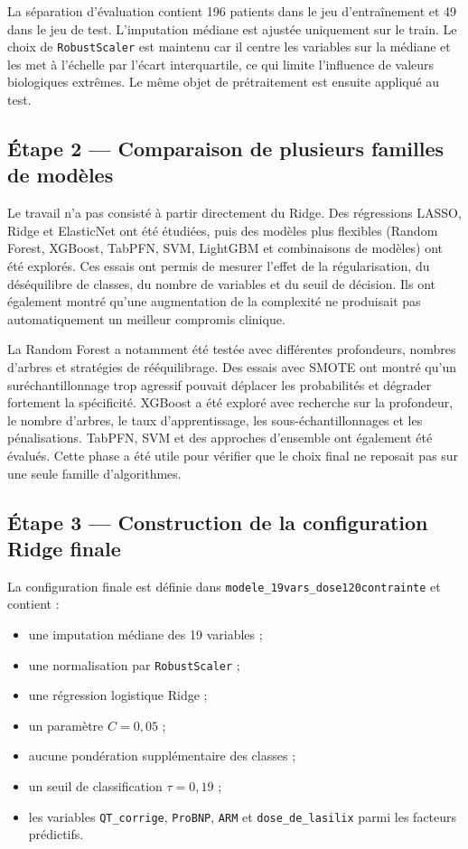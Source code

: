 \documentclass[12pt,a4paper]{report}
\begin{document}
La séparation d'évaluation contient 196 patients dans le jeu d'entraînement et 49 dans le
jeu de test. L'imputation médiane est ajustée uniquement sur le train. Le choix de
\texttt{RobustScaler} est maintenu car il centre les variables sur la médiane et les met à
l'échelle par l'écart interquartile, ce qui limite l'influence de valeurs biologiques
extrêmes. Le même objet de prétraitement est ensuite appliqué au test.

\subsection{Étape 2 --- Comparaison de plusieurs familles de modèles}

Le travail n'a pas consisté à partir directement du Ridge. Des régressions LASSO, Ridge et
ElasticNet ont été étudiées, puis des modèles plus flexibles (Random Forest, XGBoost,
TabPFN, SVM, LightGBM et combinaisons de modèles) ont été explorés. Ces essais ont permis de
mesurer l'effet de la régularisation, du déséquilibre de classes, du nombre de variables et
du seuil de décision. Ils ont également montré qu'une augmentation de la complexité ne
produisait pas automatiquement un meilleur compromis clinique.

La Random Forest a notamment été testée avec différentes profondeurs, nombres d'arbres et
stratégies de rééquilibrage. Des essais avec SMOTE ont montré qu'un suréchantillonnage trop
agressif pouvait déplacer les probabilités et dégrader fortement la spécificité. XGBoost a
été exploré avec recherche sur la profondeur, le nombre d'arbres, le taux d'apprentissage,
les sous-échantillonnages et les pénalisations. TabPFN, SVM et des approches d'ensemble ont
également été évalués. Cette phase a été utile pour vérifier que le choix final ne reposait
pas sur une seule famille d'algorithmes.

\subsection{Étape 3 --- Construction de la configuration Ridge finale}

La configuration finale est définie dans \texttt{modele\_19vars\_dose120contrainte} et contient :
\begin{itemize}[leftmargin=1.5em]
 \item une imputation médiane des 19 variables ;
 \item une normalisation par \texttt{RobustScaler} ;
 \item une régression logistique Ridge ;
 \item un paramètre $C=0{,}05$ ;
 \item aucune pondération supplémentaire des classes ;
 \item un seuil de classification $\tau=0{,}19$ ;
 \item les variables \texttt{QT\_corrige}, \texttt{ProBNP}, \texttt{ARM} et \texttt{dose\_de\_lasilix} parmi les facteurs prédictifs.
\end{itemize}
\end{document}

